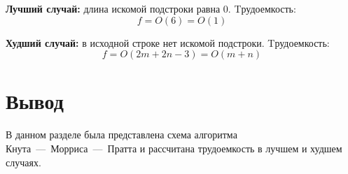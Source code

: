 \textbf{Лучший случай:} длина искомой подстроки равна 0. Tрудоемкость:
\begin{equation}
	f = O(6) = O(1)
\end{equation}

\textbf{Худший случай:} в исходной строке нет искомой подстроки. Tрудоемкость:
\begin{equation}
	f = O(2m + 2n - 3) = O(m + n)
\end{equation}


\section{Вывод}

В данном разделе была представлена схема алгоритма Кнута~---~Морриса~---~Пратта и рассчитана трудоемкость в лучшем и худшем случаях.